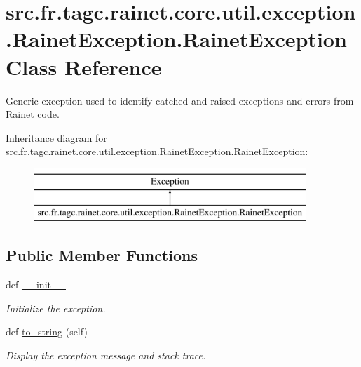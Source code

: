\hypertarget{classsrc_1_1fr_1_1tagc_1_1rainet_1_1core_1_1util_1_1exception_1_1RainetException_1_1RainetException}{}\section{src.\+fr.\+tagc.\+rainet.\+core.\+util.\+exception.\+Rainet\+Exception.\+Rainet\+Exception Class Reference}
\label{classsrc_1_1fr_1_1tagc_1_1rainet_1_1core_1_1util_1_1exception_1_1RainetException_1_1RainetException}


Generic exception used to identify catched and raised exceptions and errors from Rainet code.  


Inheritance diagram for src.\+fr.\+tagc.\+rainet.\+core.\+util.\+exception.\+Rainet\+Exception.\+Rainet\+Exception\+:\begin{figure}[H]
\begin{center}
\leavevmode
\includegraphics[height=2.000000cm]{classsrc_1_1fr_1_1tagc_1_1rainet_1_1core_1_1util_1_1exception_1_1RainetException_1_1RainetException}
\end{center}
\end{figure}
\subsection*{Public Member Functions}
\begin{DoxyCompactItemize}
\item 
def \hyperlink{classsrc_1_1fr_1_1tagc_1_1rainet_1_1core_1_1util_1_1exception_1_1RainetException_1_1RainetException_aacef80ab04c0067ea376b4dc436c3ba7}{\+\_\+\+\_\+init\+\_\+\+\_\+}
\begin{DoxyCompactList}\small\item\em Initialize the exception. \end{DoxyCompactList}\item 
\hypertarget{classsrc_1_1fr_1_1tagc_1_1rainet_1_1core_1_1util_1_1exception_1_1RainetException_1_1RainetException_a1c16b6658657b95368ad3c349f291be3}{}def \hyperlink{classsrc_1_1fr_1_1tagc_1_1rainet_1_1core_1_1util_1_1exception_1_1RainetException_1_1RainetException_a1c16b6658657b95368ad3c349f291be3}{to\+\_\+string} (self)\label{classsrc_1_1fr_1_1tagc_1_1rainet_1_1core_1_1util_1_1exception_1_1RainetException_1_1RainetException_a1c16b6658657b95368ad3c349f291be3}

\begin{DoxyCompactList}\small\item\em Display the exception message and stack trace. \end{DoxyCompactList}\end{DoxyCompactItemize}
